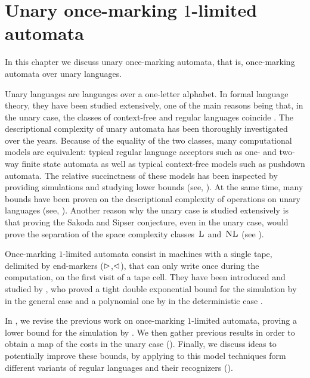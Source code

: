 \chapter{Unary once-marking \texorpdfstring{$1$}{1}-limited automata}\label{ch:oncemarking}
In this chapter we discuss unary once-marking automata, that is, once-marking automata over unary languages.

Unary languages are languages over a one-letter alphabet.
In formal language theory, they have been studied extensively, one of the main reasons being that, in the unary case, the classes of context-free and regular languages coincide \cite{GinRic62}.
The descriptional complexity of unary automata has been thoroughly investigated over the years.
Because of the equality of the two classes, many computational models are equivalent: typical regular language acceptors such as one- and two-way finite state automata as well as typical context-free models such as pushdown automata.
The relative succinctness of these models has been inspected by providing simulations and studying lower bounds (see, \eg[,] \cite{GefMer+03,MerPig01,Pig09,PigSha+02}).
At the same time, many bounds have been proven on the descriptional complexity of operations on unary languages (see, \eg[,] \cite{HolKut03,KunOkh12,MerPig05,PigSha02}).
Another reason why the unary case is studied extensively is that proving the Sakoda and Sipser conjecture, even in the unary case, would prove the separation of the space complexity classes~$\textsc{L}$ and~$\textsc{NL}$ (see ).

Once-marking $1$-limited automata consist in machines with a single tape, delimited by end-markers ($\rhd$,$\lhd$), that can only write once during the computation, on the first visit of a tape cell.
They have been introduced and studied by \citeauthor{PigPri23a}, who proved a tight double exponential bound for the simulation by \ODFAs in the general case and a polynomial one by \TDFAs in the deterministic case \cite{PigPri23a}.

In , we revise the previous work on once-marking $1$-limited automata, proving a lower bound for the simulation by \ONFAs.
We then gather previous results in order to obtain a map of the costs in the unary case ().
Finally, we discuss ideas to potentially improve these bounds, by applying to this model techniques form different variants of regular languages and their recognizers ().



